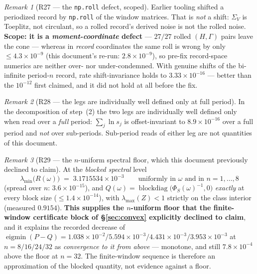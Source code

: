 \documentclass[11pt]{article}
\theoremstyle{definition}
\theoremstyle{remark}
\newtheorem{remark}{Remark}
\begin{document}
\begin{remark}[R27 --- the \texttt{np.roll} defect, scoped]
\label{rem:R27}
Earlier tooling shifted a periodized record by \texttt{np.roll} of the
window matrices. That is \emph{not} a shift: $\Sigma_V$ is Toeplitz,
not circulant, so a rolled record's derived noise is not the rolled
noise. \textbf{Scope: it is a \emph{moment-coordinate} defect} ---
$27/27$ rolled $(H,\Gamma)$ pairs leave the cone --- whereas in
\emph{record} coordinates the same roll is wrong by only
$\le4.3\times10^{-9}$ (this document's re-run: $2.8\times10^{-9}$), so
pre-fix record-space numerics are neither over- nor under-condemned.
With genuine shifts of the bi-infinite period-$n$ record, rate
shift-invariance holds to $3.33\times10^{-16}$ --- better than the
$10^{-12}$ first claimed, and it did not hold at all before the fix.
\end{remark}

\begin{remark}[R28 --- the legs are individually well defined only at
full period]
\label{rem:R28}
In the decomposition of step~(2) the two legs are individually
well defined only when read over a \emph{full} period: $\sum_j\ln s_j$
is offset-invariant to $8.9\times10^{-16}$ over a full period and
\emph{not} over sub-periods. Sub-period reads of either leg are not
quantities of this document.
\end{remark}

\begin{remark}[R29 --- the $n$-uniform spectral floor, which this
document previously declined to claim]
\label{rem:R29}
At the \emph{blocked spectral} level
\[
\lambda_{\min}\bigl(R(\omega)\bigr)\;=\;3.1715534\times10^{-3}
\qquad\text{uniformly in }\omega\text{ and in }n=1,\dots,8
\]
(spread over $n$: $3.6\times10^{-15}$), and
$Q(\omega)=\operatorname{blockdiag}\bigl(\Phi_S(\omega)^{-1},0\bigr)$
\emph{exactly} at every block size ($\le1.4\times10^{-14}$), with
$\lambda_{\max}(Z)<1$ strictly on the class interior (measured
$0.9154$). \textbf{This supplies the $n$-uniform floor that the
finite-window certificate block of \S\ref{sec:convex} explicitly
declined to claim}, and it explains the recorded decrease of
$\operatorname{eigmin}(P-Q)=1.038\times10^{-2}/5.594\times10^{-3}/
4.431\times10^{-3}/3.953\times10^{-3}$ at $n=8/16/24/32$ as
\emph{convergence to it from above} --- monotone, and still
$7.8\times10^{-4}$ above the floor at $n=32$. The finite-window
sequence is therefore an approximation of the blocked quantity, not
evidence against a floor.
\end{remark}
\end{document}
